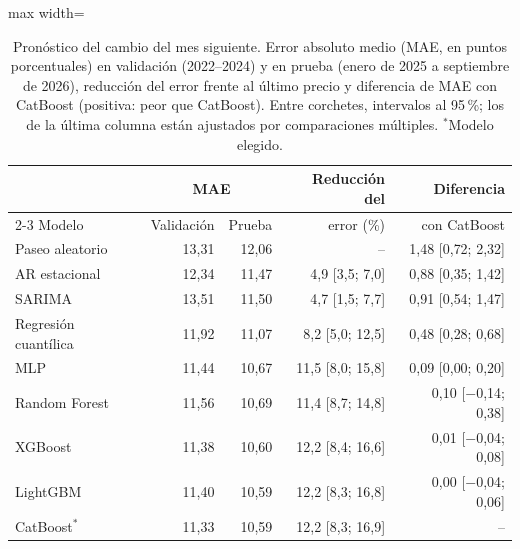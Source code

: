 \begin{table}[htbp]\centering\small
\caption{Pronóstico del cambio del mes siguiente. Error absoluto medio (MAE, en puntos porcentuales) en validación (2022--2024) y en prueba (enero de 2025 a septiembre de 2026), reducción del error frente al último precio y diferencia de MAE con CatBoost (positiva: peor que CatBoost). Entre corchetes, intervalos al 95\,\%; los de la última columna están ajustados por comparaciones múltiples. $^\ast$Modelo elegido.}\label{tab:reg}
\begin{adjustbox}{max width=\textwidth}\begin{tabular}{lrrrr}\toprule
& \multicolumn{2}{c}{MAE} & Reducción del & Diferencia \\ \cmidrule(lr){2-3}
Modelo & Validación & Prueba & error (\%) & con CatBoost\\ \midrule
Paseo aleatorio & 13{,}31 & 12{,}06 & -- & 1{,}48 [0{,}72; 2{,}32] \\
AR estacional & 12{,}34 & 11{,}47 & 4{,}9 [3{,}5; 7{,}0] & 0{,}88 [0{,}35; 1{,}42] \\
SARIMA & 13{,}51 & 11{,}50 & 4{,}7 [1{,}5; 7{,}7] & 0{,}91 [0{,}54; 1{,}47] \\
\midrule
Regresión cuantílica & 11{,}92 & 11{,}07 & 8{,}2 [5{,}0; 12{,}5] & 0{,}48 [0{,}28; 0{,}68] \\
MLP & 11{,}44 & 10{,}67 & 11{,}5 [8{,}0; 15{,}8] & 0{,}09 [0{,}00; 0{,}20] \\
Random Forest & 11{,}56 & 10{,}69 & 11{,}4 [8{,}7; 14{,}8] & 0{,}10 [\ensuremath{-}0{,}14; 0{,}38] \\
XGBoost & 11{,}38 & 10{,}60 & 12{,}2 [8{,}4; 16{,}6] & 0{,}01 [\ensuremath{-}0{,}04; 0{,}08] \\
LightGBM & 11{,}40 & 10{,}59 & 12{,}2 [8{,}3; 16{,}8] & 0{,}00 [\ensuremath{-}0{,}04; 0{,}06] \\
CatBoost$^\ast$ & 11{,}33 & 10{,}59 & 12{,}2 [8{,}3; 16{,}9] & -- \\
\bottomrule\end{tabular}\end{adjustbox}\end{table}
